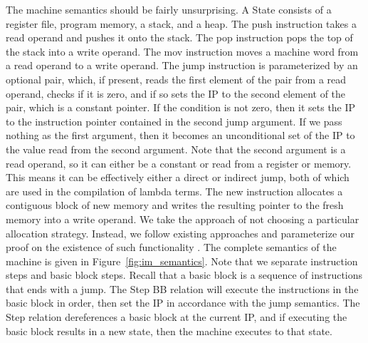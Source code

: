 The machine semantics should be fairly unsurprising. A State consists of a
register file, program memory, a stack, and a heap. The push instruction takes a
read operand and pushes it onto the stack. The pop instruction pops the
top of the stack into a write operand. The mov instruction moves a machine word
from a read operand to a write operand. The jump instruction is parameterized by
an optional pair, which, if present, reads the first element of the pair from a
read operand, checks if it is zero, and if so sets the IP to the second element
of the pair, which is a constant pointer. If the condition is not zero, then it
sets the IP to the instruction pointer contained in the second jump argument. If
we pass nothing as the first argument, then it becomes an unconditional set of
the IP to the value read from the second argument.  Note that the second
argument is a read operand, so it can either be a constant or read from a register
or memory. This means it can be effectively either a direct or indirect jump,
both of which are used in the compilation of lambda terms. The new instruction
allocates a contiguous block of new memory and writes the resulting pointer to
the fresh memory into a write operand. We take the approach of not choosing a
particular allocation strategy. Instead, we follow existing approaches and
parameterize our proof on the existence of such functionality
\cite{chlipala2007certified}. The complete semantics of the machine is given in
Figure~\ref{fig:im_semantics}.  Note that we separate instruction steps and
basic block steps. Recall that a basic block is a sequence of instructions that
ends with a jump. The Step BB relation will execute the instructions in the
basic block in order, then set the IP in accordance with the jump semantics. The
Step relation dereferences a basic block at the current IP, and if executing the
basic block results in a new state, then the machine executes to that state. 

